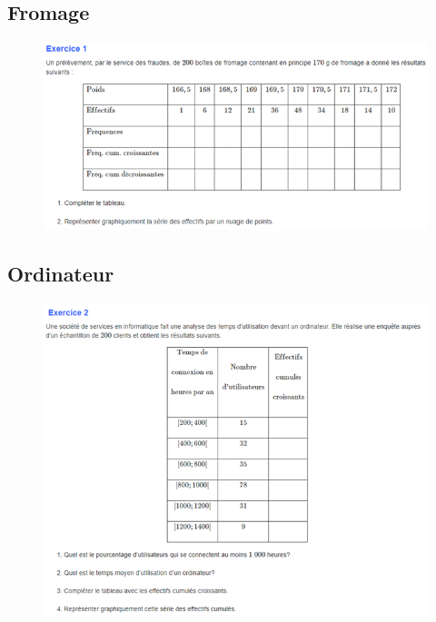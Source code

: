 \documentclass[utf8, a4paper, 12 pt]{article}
\begin{document}
            \subsection{Fromage}
                \begin{figure}[H]
                    \centering
                    \includegraphics[width=1\linewidth]{img/exercice1-fromage.PNG}
                \end{figure}
        
            \subsection{Ordinateur}
            \begin{figure}[H]
                \centering
                \includegraphics[width=1\linewidth]{img/exercice2-ordinateur.PNG}
            \end{figure}


\end{document}
